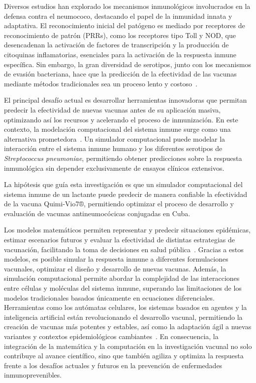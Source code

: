 Diversos estudios han explorado los mecanismos inmunológicos involucrados en la defensa contra el neumococo, destacando el papel de la inmunidad innata y adaptativa. El reconocimiento inicial del patógeno es mediado por receptores de reconocimiento de patrón (PRRs), como los receptores tipo Toll y NOD, que desencadenan la activación de factores de transcripción y la producción de citoquinas inflamatorias, esenciales para la activación de la respuesta inmune específica. Sin embargo, la gran diversidad de serotipos, junto con los mecanismos de evasión bacteriana, hace que la predicción de la efectividad de las vacunas mediante métodos tradicionales sea un proceso lento y costoso~\cite{Janeway2002}.

El principal desafío actual es desarrollar herramientas innovadoras que permitan predecir la efectividad de nuevas vacunas antes de su aplicación masiva, optimizando así los recursos y acelerando el proceso de inmunización. En este contexto, la modelación computacional del sistema inmune surge como una alternativa prometedora~\cite{Castiglione2014}. Un simulador computacional puede modelar la interacción entre el sistema inmune humano y los diferentes serotipos de \textit{Streptococcus pneumoniae}, permitiendo obtener predicciones sobre la respuesta inmunológica sin depender exclusivamente de ensayos clínicos extensivos.


La hipótesis que guía esta investigación es que un simulador computacional del sistema inmune de un lactante puede predecir de manera confiable la efectividad de la vacuna Quimi-Vio7®, permitiendo optimizar el proceso de desarrollo y evaluación de vacunas antineumocócicas conjugadas en Cuba.


Los modelos matemáticos permiten representar y predecir situaciones epidémicas, estimar escenarios futuros y evaluar la efectividad de distintas estrategias de vacunación, facilitando la toma de decisiones en salud pública~\cite{UC3M2022}. Gracias a estos modelos, es posible simular la respuesta inmune a diferentes formulaciones vacunales, optimizar el diseño y desarrollo de nuevas vacunas. Además, la simulación computacional permite abordar la complejidad de las interacciones entre células y moléculas del sistema inmune, superando las limitaciones de los modelos tradicionales basados únicamente en ecuaciones diferenciales. Herramientas como los autómatas celulares, los sistemas basados en agentes y la inteligencia artificial están revolucionando el desarrollo vacunal, permitiendo la creación de vacunas más potentes y estables, así como la adaptación ágil a nuevas variantes y contextos epidemiológicos cambiantes~\cite{DW2023}. En consecuencia, la integración de la matemática y la computación en la investigación vacunal no solo contribuye al avance científico, sino que también agiliza y optimiza la respuesta frente a los desafíos actuales y futuros en la prevención de enfermedades inmunoprevenibles.

